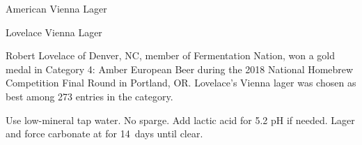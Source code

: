 \begin{recipie}{American Vienna Lager}
\begin{ingredientsblock}
\begin{yeasts}
\end{yeasts}

\end{ingredientsblock}

\begin{recipie}{Lovelace Vienna Lager}

\begin{aboutblock}
Robert Lovelace of Denver, NC, member of Fermentation Nation, won a gold medal in
Category 4: Amber European Beer during the 2018 National Homebrew Competition Final
Round in Portland, OR. Lovelace's Vienna lager was chosen as best among 273 entries
in the category.
\end{aboutblock}


\begin{methodandtiming}
 
\begin{mashsteps}
\end{mashsteps}

\begin{fermentationsteps}
\end{fermentationsteps}

\begin{directions}
Use low-mineral tap water. No sparge. Add lactic acid for 5.2 pH if needed. Lager and
force carbonate at  for 14~days until clear.
\end{directions}

\end{methodandtiming}

\pagebreak

\begin{ingredientsblock}

\begin{malts}
\end{malts}


\end{ingredientsblock}
\end{recipie}
\end{recipie}
